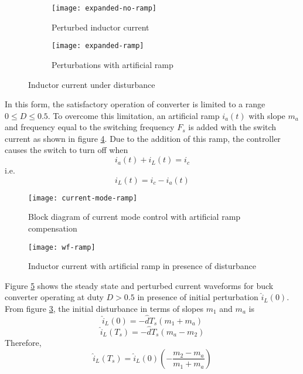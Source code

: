 	\begin{figure}[H]
		\begin{subfigure}{0.5\textwidth}
			\centering
			\texttt{[image: expanded-no-ramp]}
			\caption{Perturbed inductor current}
			\label{fig:20}
		\end{subfigure}
		\begin{subfigure}{0.5\textwidth}
			\centering
			\texttt{[image: expanded-ramp]}
			\caption{Perturbations with artificial ramp}
			\label{fig:23}
		\end{subfigure}
		\caption{Inductor current under disturbance}
	\end{figure}

	In this form, the satisfactory operation of converter is limited to a range $0 \leq D \leq 0.5$. To overcome this limitation, an artificial ramp $i_a(t)$ with slope $m_a$ and frequency equal to the switching frequency $F_s$ is added with the switch current as shown in figure \ref{fig:21}. Due to the addition of this ramp, the controller causes the switch to turn off when
	\begin{equation*}
		i_a(t) + i_L(t) = i_c
	\end{equation*}
	i.e.
	\begin{equation}
		i_L(t) = i_c - i_a(t)
		\label{eq:9}
	\end{equation}
	
	\begin{figure}[H]
		\centering
		\texttt{[image: current-mode-ramp]}
		\caption{Block diagram of current mode control with artificial ramp compensation}
		\label{fig:21}
	\end{figure}

	\begin{figure}[H]
		\centering
		\texttt{[image: wf-ramp]}
		\caption{Inductor current with artificial ramp in presence of disturbance}
		\label{fig:22}
	\end{figure}

	Figure \ref{fig:22} shows the steady state and perturbed current waveforms for buck converter operating at duty $D>0.5$ in presence of initial perturbation $\hat{i}_L(0)$. From figure \ref{fig:23}, the initial disturbance in terms of slopes $m_1$ and $m_a$ is
	\begin{equation}
		\hat{i}_L(0) = -\hat{d}T_s(m_1+m_a)
		\label{eq:10}
	\end{equation}
	\begin{equation}
		\hat{i}_L(T_s) = -\hat{d}T_s(m_a-m_2)
		\label{eq:11}
	\end{equation}
	Therefore,
	\begin{equation}
		\hat{i}_L(T_s) = \hat{i}_L(0)\left(-\dfrac{m_2-m_a}{m_1+m_a} \right)
		\label{eq:12}
	\end{equation}

